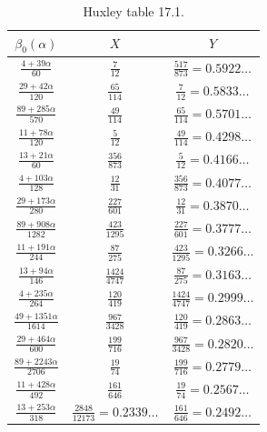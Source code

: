 \literature
{}

\begin{table}[ht]
    \caption{Huxley table 17.1.}
    \label{huxley-table-1}
    \centering
    \renewcommand{\arraystretch}{1.2}
    \begin{tabular}{|c|c|c|}
    \hline
    $\beta_0(\alpha)$  & $X$ & $Y$ \\
    \hline
    $\frac{4+39\alpha}{60}$ & $\frac{7}{12}$ & $\frac{517}{873} = 0.5922\dots$ \\
    \hline
    $\frac{29+42\alpha}{120}$ & $\frac{65}{114}$ & $\frac{7}{12} = 0.5833\dots$ \\
    \hline
    $\frac{89+285\alpha}{570}$ & $\frac{49}{114}$ & $\frac{65}{114} = 0.5701\dots$ \\
    \hline
    $\frac{11+78\alpha}{120}$ & $\frac{5}{12}$ & $\frac{49}{114} = 0.4298\dots$ \\
    \hline
    $\frac{13+21\alpha}{60}$ & $\frac{356}{873}$ & $\frac{5}{12} = 0.4166\dots$ \\
    \hline
    $\frac{4+103\alpha}{128}$ & $\frac{12}{31}$ & $\frac{356}{873} = 0.4077\dots$ \\
    \hline
    $\frac{29+173\alpha}{280}$ & $\frac{227}{601}$ & $\frac{12}{31} = 0.3870\dots$ \\
    \hline
    $\frac{89+908\alpha}{1282}$ & $\frac{423}{1295}$ & $\frac{227}{601} = 0.3777\dots$ \\
    \hline
    $\frac{11+191\alpha}{244}$ & $\frac{87}{275}$ & $\frac{423}{1295} = 0.3266\dots$ \\
    \hline
    $\frac{13+94\alpha}{146}$ & $\frac{1424}{4747}$ & $\frac{87}{275} = 0.3163\dots$\\
    \hline
    $\frac{4+235\alpha}{264}$ & $\frac{120}{419}$ & $\frac{1424}{4747}=0.2999\dots$ \\
    \hline
    $\frac{49+1351\alpha}{1614}$ & $\frac{967}{3428}$ & $\frac{120}{419} = 0.2863\dots$ \\
    \hline
    $\frac{29+464\alpha}{600}$ & $\frac{199}{716}$ & $\frac{967}{3428} = 0.2820\dots$ \\
    \hline
    $\frac{89+2243\alpha}{2706}$ & $\frac{19}{74}$ & $\frac{199}{716} = 0.2779\dots$ \\
    \hline
    $\frac{11+428\alpha}{492}$ & $\frac{161}{646}$ & $\frac{19}{74} = 0.2567\dots$ \\
    \hline
    $\frac{13+253\alpha}{318}$ & $\frac{2848}{12173} =0.2339\dots$ & $\frac{161}{646} = 0.2492\dots$ \\
    \hline
    \end{tabular}
    \end{table}

